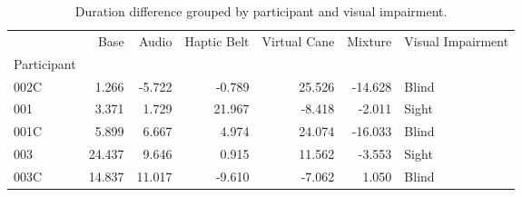 
\begin{table}[!htb]
\centering
\caption{Duration difference grouped by participant and visual impairment.}
\label{tab:duracao_var_group}
\begin{tabular}{lrrrrrl}
\toprule
{} &   Base &  Audio &  Haptic Belt &  Virtual Cane &  Mixture & Visual Impairment \\
Participant &        &        &              &               &          &                   \\
\midrule
002C        &  1.266 & -5.722 &       -0.789 &        25.526 &  -14.628 &             Blind \\
001         &  3.371 &  1.729 &       21.967 &        -8.418 &   -2.011 &             Sight \\
001C        &  5.899 &  6.667 &        4.974 &        24.074 &  -16.033 &             Blind \\
003         & 24.437 &  9.646 &        0.915 &        11.562 &   -3.553 &             Sight \\
003C        & 14.837 & 11.017 &       -9.610 &        -7.062 &    1.050 &             Blind \\
\bottomrule
\end{tabular}
\end{table}

